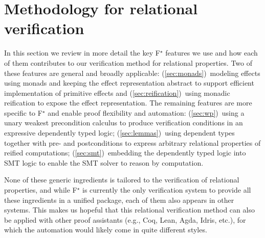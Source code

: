 \documentclass[sigplan,screen]{acmart}\settopmatter{}
\newcommand\fstar{F$^\star$\xspace}
\newcommand{\comm}[3]{\ifcheckpagebudget\else\ifdraft{\maybecolor{#1}[#2: #3]}\fi\fi}
\newcommand{\ch}[1]{\comm{teal}{CH}{#1}}
\newcommand*{\EG}{e.g.,\xspace}
\begin{document}
\section{Methodology for relational verification}
\label{sec:ingredients}



In this section we review in more detail the key \fstar{}
features we use and how each of them contributes to our
verification method for relational properties.
%
Two of these features are general and broadly applicable:
%
(\autoref{sec:monads})~modeling effects using monads and keeping the
effect representation abstract to support efficient implementation of
primitive effects and
%
(\autoref{sec:reification})~using monadic reification to expose the
effect representation.
%
The remaining features are more specific to \fstar and
enable proof flexibility and automation:
%
(\autoref{sec:wp})~using a unary weakest precondition calculus to
  produce verification conditions in an expressive dependently typed
  logic;
%
(\autoref{sec:lemmas})~using dependent types together with pre- and
postconditions to express arbitrary relational properties of reified
computations;
%
(\autoref{sec:smt})~embedding the dependently typed logic into SMT
   logic to enable the SMT solver to reason by
   computation.

None of these generic ingredients is tailored to the verification
of relational properties, and while \fstar{} is currently the only
verification system to provide all these ingredients in a unified package,
each of them also appears in other systems.
%
This makes us hopeful that this relational verification method can
also be applied with other proof assistants (\EG Coq, Lean, Agda,
Idris, etc.), for which the automation would likely come in quite
different styles.


\end{document}
